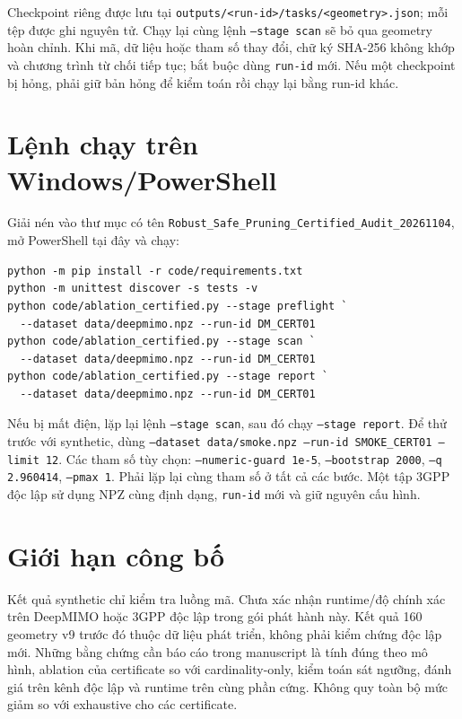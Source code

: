 \documentclass[onecolumn,11pt]{IEEEtran}
\begin{document}
Checkpoint riêng được lưu tại \texttt{outputs/<run-id>/tasks/<geometry>.json}; mỗi tệp được ghi nguyên tử. Chạy lại cùng lệnh \texttt{--stage scan} sẽ bỏ qua geometry hoàn chỉnh. Khi mã, dữ liệu hoặc tham số thay đổi, chữ ký SHA-256 không khớp và chương trình từ chối tiếp tục; bắt buộc dùng \texttt{run-id} mới. Nếu một checkpoint bị hỏng, phải giữ bản hỏng để kiểm toán rồi chạy lại bằng run-id khác.
\section{Lệnh chạy trên Windows/PowerShell}
Giải nén vào thư mục có tên \texttt{Robust\_Safe\_Pruning\_Certified\_Audit\_20261104}, mở PowerShell tại đây và chạy:
\begin{footnotesize}
\begin{verbatim}
python -m pip install -r code/requirements.txt
python -m unittest discover -s tests -v
python code/ablation_certified.py --stage preflight `
  --dataset data/deepmimo.npz --run-id DM_CERT01
python code/ablation_certified.py --stage scan `
  --dataset data/deepmimo.npz --run-id DM_CERT01
python code/ablation_certified.py --stage report `
  --dataset data/deepmimo.npz --run-id DM_CERT01
\end{verbatim}
\end{footnotesize}
Nếu bị mất điện, lặp lại lệnh \texttt{--stage scan}, sau đó chạy \texttt{--stage report}. Để thử trước với synthetic, dùng \texttt{--dataset data/smoke.npz --run-id SMOKE\_CERT01 --limit 12}. Các tham số tùy chọn: \texttt{--numeric-guard 1e-5}, \texttt{--bootstrap 2000}, \texttt{--q 2.960414}, \texttt{--pmax 1}. Phải lặp lại cùng tham số ở tất cả các bước. Một tập 3GPP độc lập sử dụng NPZ cùng định dạng, \texttt{run-id} mới và giữ nguyên cấu hình.
\section{Giới hạn công bố}
Kết quả synthetic chỉ kiểm tra luồng mã. Chưa xác nhận runtime/độ chính xác trên DeepMIMO hoặc 3GPP độc lập trong gói phát hành này. Kết quả 160 geometry v9 trước đó thuộc dữ liệu phát triển, không phải kiểm chứng độc lập mới. Những bằng chứng cần báo cáo trong manuscript là tính đúng theo mô hình, ablation của certificate so với cardinality-only, kiểm toán sát ngưỡng, đánh giá trên kênh độc lập và runtime trên cùng phần cứng. Không quy toàn bộ mức giảm so với exhaustive cho các certificate.
\end{document}

